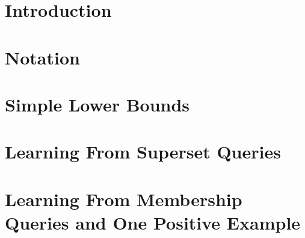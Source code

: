 \documentclass[runningheads]{llncs}
\begin{document}
%
%
%

\section{Introduction}


\section{Notation}



\section{Simple Lower Bounds}


\section{Learning From Superset Queries}

\section{Learning From Membership Queries and One Positive Example}

\end{document}
